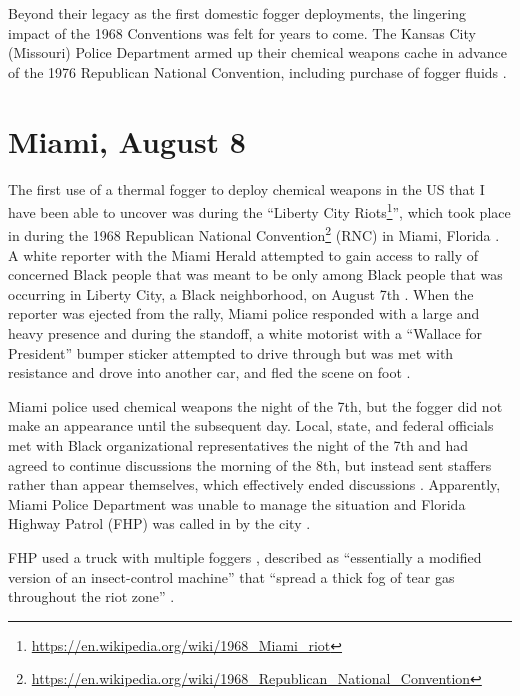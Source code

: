 \documentclass[
  11pt,
]{krantz}
\renewcommand{\href}[2]{#2\footnote{\url{#1}}}
\begin{document}
Beyond their legacy as the first domestic fogger deployments, the lingering impact of the 1968 Conventions was felt for years to come.
The Kansas City (Missouri) Police Department armed up their chemical weapons cache in advance of the 1976 Republican National Convention, including purchase of fogger fluids \citep{Hudson1976}.

\hypertarget{MiamiFL1968_08_08}{%
\section*{Miami, August 8}\label{MiamiFL1968_08_08}}


The first use of a thermal fogger to deploy chemical weapons in the US that I have been able to uncover was during the ``\href{https://en.wikipedia.org/wiki/1968_Miami_riot}{Liberty City Riots}'', which took place in during the \href{https://en.wikipedia.org/wiki/1968_Republican_National_Convention}{1968 Republican National Convention} (RNC) in Miami, Florida \citep{Tschenschlok1995, Tschenschlok1996, McArdle2018}.
A white reporter with the Miami Herald attempted to gain access to rally of concerned Black people that was meant to be only among Black people that was occurring in Liberty City, a Black neighborhood, on August 7th \citep{Tschenschlok1995, Tschenschlok1996}.
When the reporter was ejected from the rally, Miami police responded with a large and heavy presence and during the standoff, a white motorist with a ``Wallace for President'' bumper sticker attempted to drive through but was met with resistance and drove into another car, and fled the scene on foot \citep{Tschenschlok1995, Lorentzen2018}.

Miami police used chemical weapons the night of the 7th, but the fogger did not make an appearance until the subsequent day.
Local, state, and federal officials met with Black organizational representatives the night of the 7th and had agreed to continue discussions the morning of the 8th, but instead sent staffers rather than appear themselves, which effectively ended discussions \citep{Tschenschlok1995, Tschenschlok1996}.
Apparently, Miami Police Department was unable to manage the situation and Florida Highway Patrol (FHP) was called in by the city \citep{Tschenschlok1995}.

FHP used a truck with multiple foggers \citep{Lorentzen2018}, described as ``essentially a modified version of an insect-control machine'' that ``spread a thick fog of tear gas throughout the riot zone'' \citep{Tschenschlok1995}.
\end{document}
